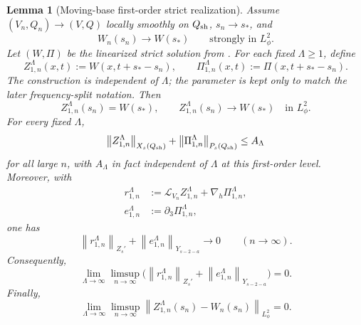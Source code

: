 \documentclass[11pt]{article}
\numberwithin{equation}{section}
\theoremstyle{plain}
\newtheorem{lemma}{Lemma}[section]
\theoremstyle{definition}
\theoremstyle{remark}
\newcommand{\nabh}{\nabla_h}
\newcommand{\norm}[2]{\left\|#1\right\|_{#2}}
\begin{document}
\begin{lemma}[Moving-base first-order strict realization]\label{pIV:lem:C-moving-base-stability}
Assume \((V_n,Q_n)\to(V,Q)\) locally smoothly on \(Q_{\rm sh}\), \(s_n\to s_*\), and
\[
        W_n(s_n)\to W(s_*)\qquad\text{strongly in }L^2_\phi .
\]
Let \((W,\Pi)\) be the linearized strict solution from .
For each fixed \(\Lambda\ge1\), define
\[
        Z_{1,n}^\Lambda(x,t):=W(x,t+s_*-s_n),
        \qquad
        \Pi_{1,n}^\Lambda(x,t):=\Pi(x,t+s_*-s_n).
\]
The construction is independent of \(\Lambda\); the parameter is kept only to match
the later frequency-split notation.  Then
\begin{equation}\label{pIV:eq:trace-data-window}
        Z_{1,n}^\Lambda(s_n)=W(s_*),
        \qquad
        Z_{1,n}^\Lambda(s_n)\to W(s_*)
        \quad\text{in }L^2_\phi .
\end{equation}
For every fixed \(\Lambda\),
\begin{equation}\label{pIV:eq:window-stability-bound}
        \norm{Z_{1,n}^\Lambda}{X_s(Q_{\rm sh})}
        +\norm{\Pi_{1,n}^\Lambda}{P_s(Q_{\rm sh})}
        \le A_\Lambda
\end{equation}
for all large \(n\), with \(A_\Lambda\) in fact independent of \(\Lambda\) at this
first-order level.  Moreover, with
\begin{align}
        r_{1,n}^\Lambda &:={\mathcal L}_{V_n}Z_{1,n}^\Lambda+
        \nabh\Pi_{1,n}^\Lambda,\label{pIV:eq:r1-def}\\
        e_{1,n}^\Lambda &:=\partial_3\Pi_{1,n}^\Lambda,\label{pIV:eq:e1-def}
\end{align}
one has
\begin{equation}\label{pIV:eq:moving-base-residual-fixed}
        \norm{r_{1,n}^\Lambda}{Z_s'}+\norm{e_{1,n}^\Lambda}{Y_{s-2-a}}\to0
        \qquad(n\to\infty).
\end{equation}
Consequently,
\begin{equation}\label{pIV:eq:moving-base-residual-two-limit}
        \lim_{\Lambda\to\infty}\limsup_{n\to\infty}
        \bigl(\norm{r_{1,n}^\Lambda}{Z_s'}+\norm{e_{1,n}^\Lambda}{Y_{s-2-a}}\bigr)=0.
\end{equation}
Finally,
\begin{equation}\label{pIV:eq:trace-window-tightness}
        \lim_{\Lambda\to\infty}\limsup_{n\to\infty}
        \norm{Z_{1,n}^\Lambda(s_n)-W_n(s_n)}{L^2_\phi}=0.
\end{equation}
\end{lemma}
\end{document}
